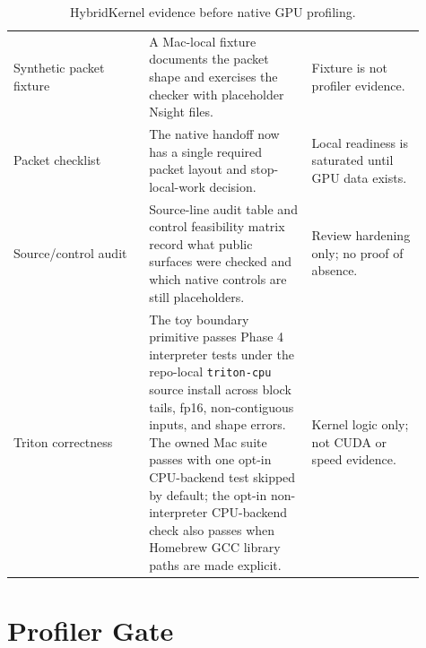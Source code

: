 \documentclass{article}
\begin{document}
\begin{table}[H]
\begin{tabular}{p{0.30\linewidth}p{0.36\linewidth}p{0.25\linewidth}}
Synthetic packet fixture & A Mac-local fixture documents the packet shape and exercises the checker with placeholder Nsight files. & Fixture is not profiler evidence. \\
Packet checklist & The native handoff now has a single required packet layout and stop-local-work decision. & Local readiness is saturated until GPU data exists. \\
Source/control audit & Source-line audit table and control feasibility matrix record what public surfaces were checked and which native controls are still placeholders. & Review hardening only; no proof of absence. \\
Triton correctness & The toy boundary primitive passes Phase 4 interpreter tests under the repo-local \texttt{triton-cpu} source install across block tails, fp16, non-contiguous inputs, and shape errors. The owned Mac suite passes with one opt-in CPU-backend test skipped by default; the opt-in non-interpreter CPU-backend check also passes when Homebrew GCC library paths are made explicit. & Kernel logic only; not CUDA or speed evidence. \\
\bottomrule
\end{tabular}
\caption{HybridKernel evidence before native GPU profiling.}
\end{table}

\section{Profiler Gate}
\end{document}

